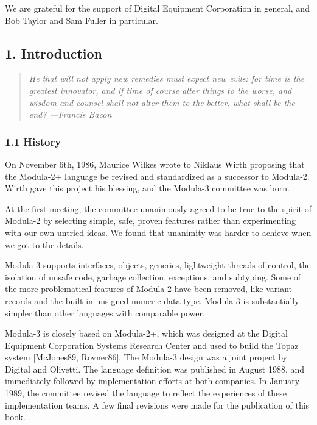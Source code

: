 \documentclass[10pt]{article}
\begin{document}
We are grateful for the support of Digital Equipment Corporation in general,
and Bob Taylor and Sam Fuller in particular.

\subsection*{1. Introduction}

\begin{quote}
  \emph{ He that will not apply new remedies must expect new evils: for time
    is the greatest innovator, and if time of course alter things to the
    worse, and wisdom and counsel shall not alter them to the better, what
    shall be the end? ---Francis Bacon }
\end{quote}

\subsubsection*{1.1 History}

On November 6th, 1986, Maurice Wilkes wrote to Niklaus Wirth proposing that
the Modula-2+ language be revised and standardized as a successor to
Modula-2.  Wirth gave this project his blessing, and the Modula-3 committee was
born.

At the first meeting, the committee unanimously agreed to be true to the
spirit of Modula-2 by selecting simple, safe, proven features rather than
experimenting with our own untried ideas.  We found that unanimity was harder
to achieve when we got to the details.

Modula-3 supports interfaces, objects, generics, lightweight threads of
control, the isolation of unsafe code, garbage collection, exceptions, and
subtyping.  Some of the more problematical features of Modula-2 have been
removed, like variant records and the built-in unsigned numeric data
type.  Modula-3 is substantially simpler than other languages with comparable
power.

Modula-3 is closely based on Modula-2+, which was designed at the Digital
Equipment Corporation Systems Research Center and used to build the Topaz
system [McJones89, Rovner86].  The Modula-3 design was a joint project by
Digital and Olivetti.  The language definition was published in August 1988,
and immediately followed by implementation efforts at both companies.  In
January 1989, the committee revised the language to reflect the experiences of
these implementation teams.  A few final revisions were made for the
publication of this book.
\end{document}
